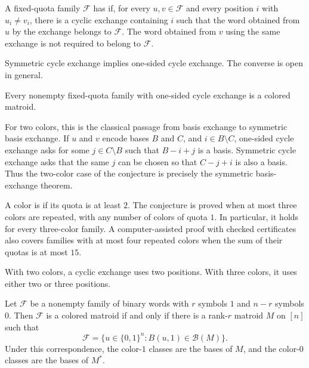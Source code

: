 \begin{definition}
A fixed-quota family $\mathcal F$ has  if,
for every $u,v\in\mathcal F$ and every position $i$ with $u_i\ne v_i$, there
is a cyclic exchange containing $i$ such that the word obtained from $u$ by
the exchange belongs to $\mathcal F$. The word obtained from $v$ using the
same exchange is not required to belong to $\mathcal F$.
\end{definition}

Symmetric cycle exchange implies one-sided cycle exchange. The converse is
open in general.

\begin{conjecture}
Every nonempty fixed-quota family with one-sided cycle exchange is a colored
matroid.
\end{conjecture}

For two colors, this is the classical passage from basis exchange to symmetric
basis exchange. If $u$ and $v$ encode bases $B$ and $C$, and $i\in B\setminus
C$, one-sided cycle exchange asks for some $j\in C\setminus B$ such that
$B-i+j$ is a basis. Symmetric cycle exchange asks that the same $j$ can be
chosen so that $C-j+i$ is also a basis. Thus the two-color case of the
conjecture is precisely the symmetric basis-exchange theorem.

A color is  if its quota is at least $2$. The conjecture is
proved when at most three colors are repeated, with any number of colors of
quota $1$. In particular, it holds for every three-color family. A
computer-assisted proof with checked certificates also covers families with
at most four repeated colors when the sum of their quotas is at most $15$.

With two colors, a cyclic exchange uses two positions. With three colors,
it uses either two or three positions.

\begin{proposition}
Let $\mathcal F$ be a nonempty family of binary words with $r$ symbols $1$
and $n-r$ symbols $0$. Then $\mathcal F$ is a colored matroid if and only if there
is a rank-$r$ matroid $M$ on $[n]$ such that
\[
 \mathcal F
 =\{u\in\{0,1\}^n:B(u,1)\in\mathcal B(M)\}.
\]
Under this correspondence, the color-$1$ classes are the bases of $M$, and
the color-$0$ classes are the bases of $M^*$.
\end{proposition}

